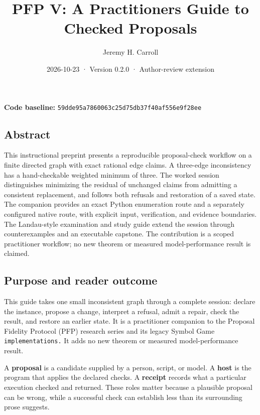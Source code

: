 \documentclass[
  11pt,
]{article}
\title{PFP V: A Practitioner\textquotesingle s Guide to Checked
Proposals}
\author{Jeremy H. Carroll}
\date{2026-10-23 · Version 0.2.0 · Author-review extension}
\begin{document}
\makeatletter
\begin{center}
{\LARGE \@title\par}
\vspace{0.8em}
{\normalsize \@author\par}
\vspace{0.5em}
{\small \@date\par}
\end{center}
\makeatother

\textbf{Code baseline:}
\nolinkurl{59dde95a7860063c25d75db37f40af556e9f28ee}

\subsection{Abstract}\label{abstract}

This instructional preprint presents a reproducible proposal-check
workflow on a finite directed graph with exact rational edge claims. A
three-edge inconsistency has a hand-checkable weighted minimum of three.
The worked session distinguishes minimizing the residual of unchanged
claims from admitting a consistent replacement, and follows both
refusals and restoration of a saved state. The companion provides an
exact Python enumeration route and a separately configured native route,
with explicit input, verification, and evidence boundaries. The
Landau-style examination and study guide extend the session through
counterexamples and an executable capstone. The contribution is a scoped
practitioner workflow; no new theorem or measured model-performance
result is claimed.

\subsection{Purpose and reader
outcome}\label{purpose-and-reader-outcome}

This guide takes one small inconsistent graph through a complete
session: declare the instance, propose a change, interpret a refusal,
admit a repair, check the result, and restore an earlier state. It is a
practitioner companion to the Proposal Fidelity Protocol (PFP) research
series and its legacy Symbol Game \nolinkurl{implementations.} It adds
no new theorem or measured model-performance result.

A \textbf{proposal} is a candidate supplied by a person, script, or
model. A \textbf{host} is the program that applies the declared checks.
A \textbf{receipt} records what a particular execution checked and
returned. These roles matter because a plausible proposal can be wrong,
while a successful check can establish less than its surrounding prose
suggests.
\end{document}
